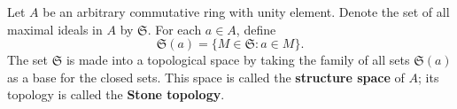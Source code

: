 Let $A$ be an arbitrary commutative ring with unity element. Denote the set of all maximal ideals in $A$ by $\mathfrak{S}$. For each $a \in A$, define
$$\mathfrak{S}(a) = \{M \in \mathfrak{S} : a \in M\}.$$
The set $\mathfrak{S}$ is made into a topological space by taking the family of all sets $\mathfrak{S}(a)$ as a base for the closed sets. This space is called the \textbf{structure space} of $A$; its topology is called the \textbf{Stone topology}.
